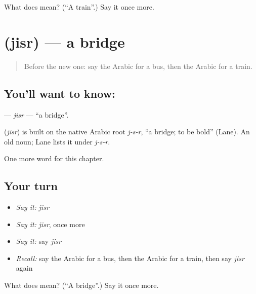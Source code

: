 \begin{tcolorbox}[breakable,colback=teal!4,colframe=teal!35!black,title={Before you move on}]
What does  mean? (\textquotedblleft{}A train\textquotedblright{}.) Say it once more.
\end{tcolorbox}
\section[\texorpdfstring{\ar{جسر} (jisr)}{جسر (jisr)}]{ (jisr) — a bridge}

\label{lesson:AR-C92-jisr}



\begin{quote}
Before the new one: say the Arabic for a bus, then the Arabic for a train.
\end{quote}

\subsection*{You'll want to know: }
\textbf{} — \emph{jisr} — \textquotedblleft{}a bridge\textquotedblright{}.

\begin{cousinweb}
\textbf{} (\emph{jisr}) is built on the native Arabic root \emph{j-s-r}, \textquotedblleft{}a bridge; to be bold\textquotedblright{} (Lane). An old noun; Lane lists it under \emph{j-s-r}.
\end{cousinweb}

\begin{grammarlens}[title={What you've built}]
One more word for this chapter.
\end{grammarlens}

\subsection*{Your turn}
\begin{itemize}
\raggedright
  \item \emph{Say it:} \emph{jisr}
  \item \emph{Say it:} \emph{jisr}, once more
  \item \emph{Say it:} say \emph{jisr}
  \item \emph{Recall:} say the Arabic for a bus, then the Arabic for a train, then say \emph{jisr} again
\end{itemize}

\begin{tcolorbox}[breakable,colback=teal!4,colframe=teal!35!black,title={Before you move on}]
What does  mean? (\textquotedblleft{}A bridge\textquotedblright{}.) Say it once more.
\end{tcolorbox}
